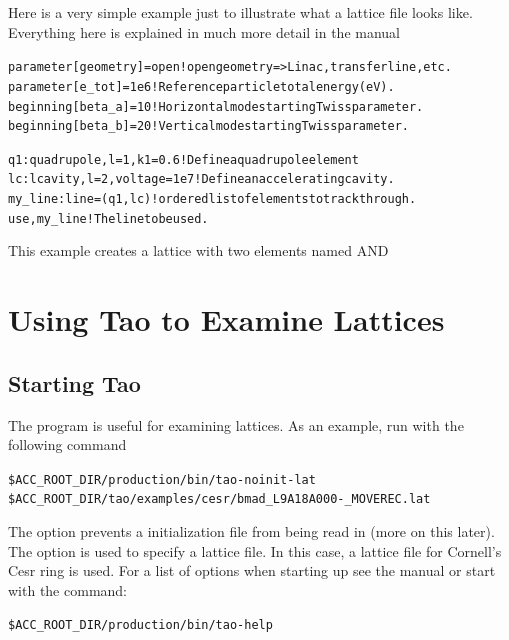 \documentclass{hitec}
\begin{document}
Here is a very simple example just to illustrate what a lattice file looks
like. Everything here is explained in much more detail in the \bmad manual
\begin{alltt}
  parameter[geometry] = open     ! open geometry => Linac, transfer line, etc.
  parameter[e_tot] = 1e6         ! Reference particle total energy (eV).
  beginning[beta_a] = 10         ! Horizontal mode starting Twiss parameter.
  beginning[beta_b] = 20         ! Vertical mode starting Twiss parameter.

  q1: quadrupole, l = 1, k1 = 0.6   ! Define a quadrupole element
  lc: lcavity, l = 2, voltage = 1e7 ! Define an accelerating cavity.
  my_line: line = (q1, lc)          ! ordered list of elements to track through.
  use, my_line                      ! The line to be used.
\end{alltt}
This example creates a lattice with two elements named  AND 

\section{Using Tao to Examine Lattices}

\subsection{Starting Tao}

The \tao program is useful for examining lattices. As an example, run \tao with
the following command
\begin{alltt}
  \$ACC_ROOT_DIR/production/bin/tao -noinit -lat \B
              \$ACC_ROOT_DIR/tao/examples/cesr/bmad_L9A18A000-_MOVEREC.lat
\end{alltt}
The  option prevents a \tao initialization file from being read in (more
on this later). The  option is used to specify a lattice file. In this case,
a lattice file for Cornell's Cesr ring is used. For a list of options when starting
up \tao see the \tao manual or start \tao with the command:
\begin{alltt}
  \$ACC_ROOT_DIR/production/bin/tao -help
\end{alltt}
\end{document}
